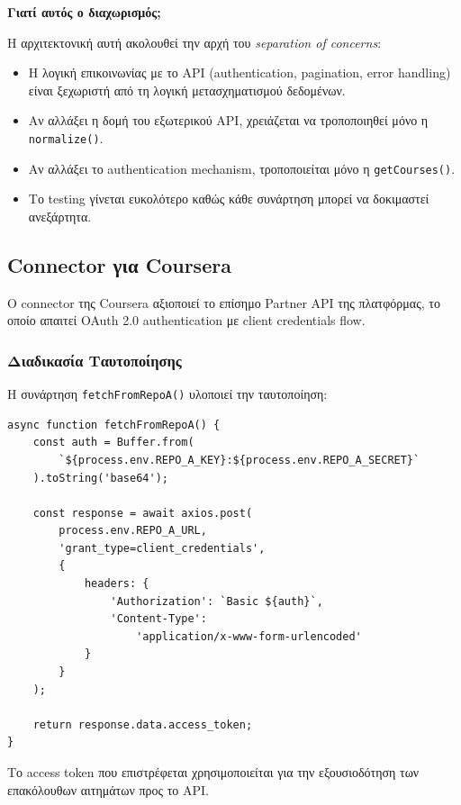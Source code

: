 \documentclass[a4paper,12pt]{article}
\begin{document}
\textbf{Γιατί αυτός ο διαχωρισμός;}

Η αρχιτεκτονική αυτή ακολουθεί την αρχή του \textit{separation of concerns}:
\begin{itemize}
    \item Η λογική επικοινωνίας με το API (authentication, pagination, error handling) είναι ξεχωριστή από τη λογική μετασχηματισμού δεδομένων.
    \item Αν αλλάξει η δομή του εξωτερικού API, χρειάζεται να τροποποιηθεί μόνο η \texttt{normalize()}.
    \item Αν αλλάξει το authentication mechanism, τροποποιείται μόνο η \texttt{getCourses()}.
    \item Το testing γίνεται ευκολότερο καθώς κάθε συνάρτηση μπορεί να δοκιμαστεί ανεξάρτητα.
\end{itemize}

\subsection{Connector για Coursera}

Ο connector της Coursera αξιοποιεί το επίσημο Partner API της πλατφόρμας, το οποίο απαιτεί OAuth 2.0 authentication με client credentials flow.

\subsubsection{Διαδικασία Ταυτοποίησης}

Η συνάρτηση \texttt{fetchFromRepoA()} υλοποιεί την ταυτοποίηση:

\begin{verbatim}
async function fetchFromRepoA() {
    const auth = Buffer.from(
        `${process.env.REPO_A_KEY}:${process.env.REPO_A_SECRET}`
    ).toString('base64');
    
    const response = await axios.post(
        process.env.REPO_A_URL, 
        'grant_type=client_credentials',
        {
            headers: {
                'Authorization': `Basic ${auth}`,
                'Content-Type': 
                    'application/x-www-form-urlencoded'
            }
        }
    );
    
    return response.data.access_token;
}
\end{verbatim}

Το access token που επιστρέφεται χρησιμοποιείται για την εξουσιοδότηση των επακόλουθων αιτημάτων προς το API.
\end{document}
